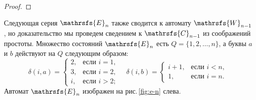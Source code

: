 \documentclass[11pt]{article}
\newcommand{\sa}{synchronizing automata}
\newcommand{\sw}{reset word}
\begin{document}
\begin{proof}
\end{proof}

%

Следующая серия $\mathrsfs{E}_n$ также сводится к автомату $\mathrsfs{W}_{n - 1}$, но доказательство мы
проведем сведением к $\mathrsfs{C}_{n - 1}$ из соображений простоты.
Множество состояний $\mathrsfs{E}_n$ есть $Q=\{1,2,\dots,n\}$,
а буквы $a$ и $b$ действуют на $Q$ следующим образом:
$$\delta(i,a)=\begin{cases}
2, &\text{если } i = 1,\\
3, &\text{если } i = 2,\\
i, &\text{если } i>2;
\end{cases}\quad
\delta(i,b)=\begin{cases}
i+1, &\text{если } i<n,\\
1, &\text{если } i=n.
\end{cases}$$
Автомат $\mathrsfs{E}_n$ изображен на рис.\,\ref{fig:e-n} слева.
\end{document}
